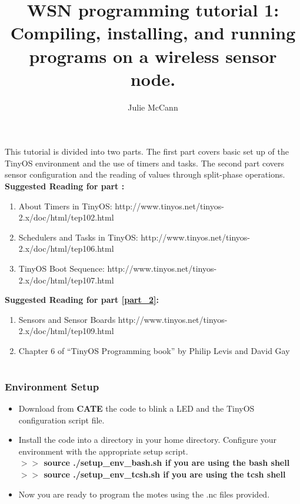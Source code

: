 \documentclass [a4] {article}
\author{Julie McCann}
\title{WSN programming tutorial 1: Compiling, installing, and running programs on a wireless sensor node.}
\begin{document}
\maketitle

This tutorial is divided into two parts. The first part covers basic set up of the TinyOS environment and the use of timers and tasks. The second part covers sensor configuration and the reading of values through split-phase operations. \\

\textbf{Suggested Reading for part \ref{part_1}:}
\begin{enumerate}
\item About Timers in TinyOS: http://www.tinyos.net/tinyos-2.x/doc/html/tep102.html
\item Schedulers and Tasks in TinyOS: http://www.tinyos.net/tinyos-2.x/doc/html/tep106.html
\item TinyOS Boot Sequence:  http://www.tinyos.net/tinyos-2.x/doc/html/tep107.html
\end{enumerate}

\textbf{Suggested Reading for part \ref{part_2}:}
\begin{enumerate}
\item Sensors and Sensor Boards http://www.tinyos.net/tinyos-2.x/doc/html/tep109.html
\item  Chapter 6 of “TinyOS Programming book” by Philip Levis and David Gay
\end{enumerate}

\part{}
\label{part_1}

\section{Environment Setup}
\begin{itemize}
\item Download from \textbf{CATE} the code to blink a LED and the TinyOS configuration script file.
\item Install the code into a directory in your home directory. Configure your environment with the appropriate setup script.\\
\textbf{$>>$ source ./setup\_env\_bash.sh if you are using the bash shell}\\
\textbf{$>>$ source ./setup\_env\_tcsh.sh if you are using the tcsh shell}
\item Now you are ready to program the motes using the .nc files provided.
\end{itemize}
\end{document}
